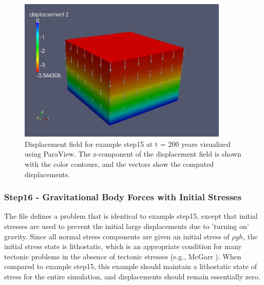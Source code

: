 \begin{figure}
  \includegraphics[width=10cm]{examples/figs/3dhex8_step15-displ-t200}
  \caption{Displacement field for example step15 at t = 200 years visualized
    using ParaView. The z-component of the displacement field is shown
    with the color contours, and the vectors show the computed displacements.}
  \label{fig:example:3dhex8:step15:displacement}
\end{figure}


\subsubsection{Step16 - Gravitational Body Forces with Initial Stresses}

The  file defines a problem that is identical to
example step15, except that initial stresses are used to prevent the
initial large displacements due to 'turning on' gravity. Since all
normal stress components are given an initial stress of $\rho gh$,
the initial stress state is lithostatic, which is an appropriate condition
for many tectonic problems in the absence of tectonic stresses (e.g.,
McGarr \cite{McGarr:1988}). When compared to example step15, this
example should maintain a lithostatic state of stress for the entire
simulation, and displacements should remain essentially zero.

